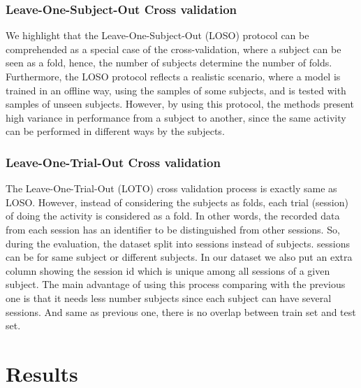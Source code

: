 \documentclass[journal,article,submit,moreauthors,pdftex]{Definitions/mdpi}
\begin{document}
\subsubsection{Leave-One-Subject-Out Cross validation}
We highlight that the Leave-One-Subject-Out (LOSO) protocol can be comprehended as a special case of the cross-validation, where a subject can be seen as a fold, hence, the number of subjects determine the number of folds. Furthermore, the LOSO protocol reflects a realistic scenario, where a model is trained in an offline way, using the samples of some subjects, and is tested with samples of unseen subjects. However, by using this protocol, the methods present high variance in performance from a subject to another, since the same activity can be performed in different ways by the subjects. 
\subsubsection{Leave-One-Trial-Out Cross validation}
The Leave-One-Trial-Out (LOTO) cross validation process is exactly same as LOSO. However, instead of considering the subjects as folds, each trial (session) of doing the activity is considered as a fold. In other words, the recorded data from each session has an identifier to be distinguished from other sessions. So, during the evaluation, the dataset split into sessions instead of subjects. sessions can be for same subject or different subjects. In our dataset we also put an extra column showing the session id which is unique among all sessions of a given subject. The main advantage of using this process comparing with the previous one is that it needs less number subjects since each subject can have several sessions. And same as previous one, there is no overlap between train set and test set.
\section{Results}
\end{document}

